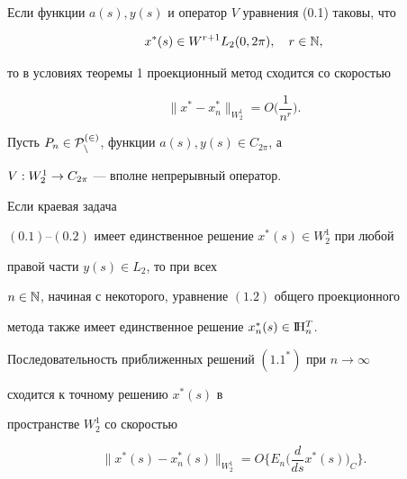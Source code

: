 \begin{cornonum}


Если функции $a(s), y(s)$ и оператор $V$ уравнения (0.1) таковы, что


\begin{equation}


x^*(s)\in W^{r+1}L_2(0,2\pi ),\quad r\in \bl{N},


\end{equation}


то в условиях теоремы 1 проекционный метод сходится со скоростью


\begin{equation}


\|x^*-x_n^*\|_{{W_2^1}}= O \bigg( \frac{1}{n^r}\bigg) .


\end{equation}


\end{cornonum}





\begin{thm}


Пусть $P_n\in \cal P_n^{(2)}$, функции $a(s), y(s)\in C_{2\pi}$, а


$V : W_2^1 \to C_{2\pi}$ --- вполне непрерывный оператор.


Если краевая задача


$(0.1)$--$(0.2)$ имеет единственное решение $x^*(s)\in W_2^1$ при любой


правой части $y(s)\in L_2$, то при всех


$n\in \Bbb N$, начиная с некоторого, уравнение $(1.2)$ общего проекционного


метода также имеет единственное решение $x_n^*(s)\in \mathrm I \!\mathrm H_n^T$.


Последовательность приближенных решений $(1.1^*)$ при $n\rightarrow \infty$


сходится к точному решению $x^*(s)$ в


пространстве $W_2^1$ со скоростью


\begin{equation}


\|x^*(s)-x_n^*(s)\|_{{W_2^1}}= O \bigg\{ E_n\bigg(\frac{d}{ds} x^*(s)


\bigg)_{C}\bigg\} .


\end{equation}


\end{thm}





